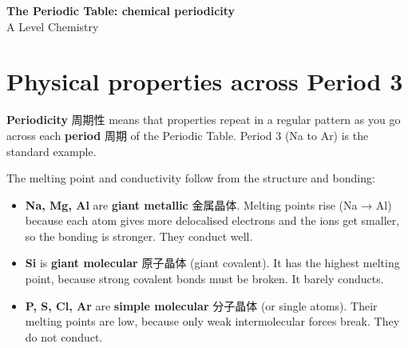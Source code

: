 \documentclass[11pt]{article}
\begin{document}
\begin{center}
  {\LARGE\bfseries The Periodic Table: chemical periodicity}\\[0.35em]
  {\large A Level Chemistry}
\end{center}
\vspace{0.6em}

\section*{Physical properties across Period 3}

\textbf{Periodicity} 周期性 means that properties repeat in a regular pattern as you go across each \textbf{period} 周期 of the Periodic Table. Period 3 (Na to Ar) is the standard example.

\begin{center}
\end{center}

The melting point and conductivity follow from the structure and bonding:

\begin{itemize}
\item \textbf{Na, Mg, Al} are \textbf{giant metallic} 金属晶体. Melting points rise (Na → Al) because each atom gives more delocalised electrons and the ions get smaller, so the bonding is stronger. They conduct well.

\item \textbf{Si} is \textbf{giant molecular} 原子晶体 (giant covalent). It has the highest melting point, because strong covalent bonds must be broken. It barely conducts.

\item \textbf{P, S, Cl, Ar} are \textbf{simple molecular} 分子晶体 (or single atoms). Their melting points are low, because only weak intermolecular forces break. They do not conduct.

\end{itemize}
\end{document}
